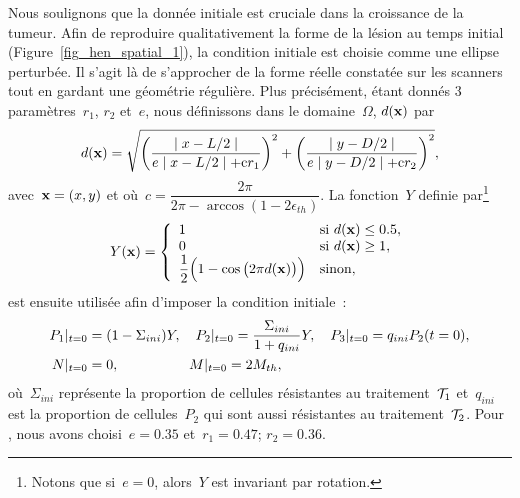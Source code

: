 \documentclass[main.tex]{subfiles}
\begin{document}
Nous soulignons que la donnée initiale est cruciale dans la croissance de la tumeur. Afin de reproduire qualitativement la forme de la lésion au temps initial (\cf Figure~\ref{fig_hen_spatial_1}), 
la condition initiale est choisie comme une ellipse perturbée. 
Il s'agit là de s'approcher de la forme réelle constatée sur les scanners tout en gardant une géométrie régulière. 
Plus précisément, étant donnés 3 paramètres~$r_1$, $r_2$ et~$e$, nous définissons dans le domaine~$\Omega$, $d(\mathbf{x})$ par
\begin{equation}\label{cond-ini}
d(\mathbf{x})=\sqrt{\left(\dfrac{\mid x - L/2 \mid }{e\mid x - L/2 \mid +
      {\rm c} r_1}\right)^2+\left(\dfrac{\mid y - D/2 \mid }{e\mid y -
      D/2 \mid + {\rm c} r_2}\right)^2 },
\end{equation}
avec~$\mathbf{x}=(x,y)$ et où~$c=\dfrac{2\pi}{2\pi-\arccos(1-2\epsilon_{th})}$. 
La fonction~$Y$ definie par\footnote{Notons que si~$e=0$, alors~$Y$ est  invariant par rotation.}
\begin{equation}Y(\mathbf{x})=\left\{
\begin{array}{ll}
1 & \textrm{si}\ d(\mathbf{x})\leq 0.5,\\
0 & \textrm{si}\ d(\mathbf{x})\geq 1, \\
\dfrac{1}{2}\Big(1-\cos \big(2\pi d(\mathbf{x})\big)\Big)& \textrm{sinon},
\label{eq:CI_forme}
\end{array}\right.
\end{equation}
est ensuite utilisée afin d'imposer la condition initiale~:
\begin{equation}
\label{eq:CI}
\begin{aligned}
P_1|_{t=0}&=(1-\Sigma_{ini})Y, \quad
P_2|_{t=0}=\dfrac{\Sigma_{ini}}{1+q_{ini}}Y, \quad
P_3|_{t=0}=q_{ini}P_2(t=0), \\
N|_{t=0}&=0, \qquad \qquad \quad
M|_{t=0}=2M_{th},
\end{aligned}
\end{equation}
où~$\Sigma_{ini}$ représente la proportion de cellules résistantes au traitement~${\mathcal T_1}$ et~$q_{ini}$ est la proportion de cellules~$P_2$
qui sont aussi résistantes au traitement~${\mathcal T_2}$. Pour \Nber, nous avons choisi~$e=0.35$ et~$r_1=0.47$; $r_2=0.36$.
\end{document}
